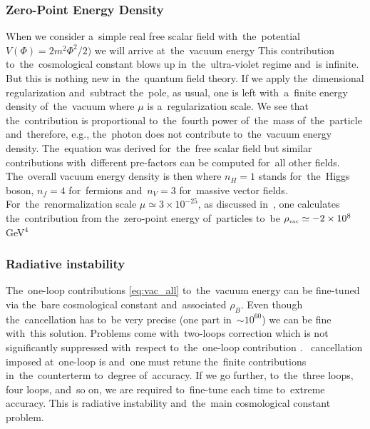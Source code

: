 \subsubsection{Zero-Point Energy Density}
When we consider a~simple real free scalar field with~the~potential $V(\Phi)=2m^2\Phi^2/2)$ we will arrive at~the~vacuum energy
This contribution to~the~cosmological constant blows up in~the~ultra-violet regime and~is infinite. But this is nothing new in~the~quantum field theory. If we apply the~dimensional regularization \parencite{tHooft:1972tcz} and~subtract the~pole, as usual, one is left with~a~finite energy density of~the~vacuum
where $\mu$ is a~regularization scale. We see that the~contribution is proportional to~the~fourth power of~the~mass of~the~particle and~therefore, e.g., the~photon does not contribute to~the~vacuum energy density. The~equation was derived for~the~free scalar field but similar contributions with~different pre-factors can be computed for~all other fields. The~overall vacuum energy density is then
where $n_H=1$ stands for~the~Higgs boson, $n_f=4$ for~fermions and~$n_V=3$ for~massive vector fields. For~the~renormalization scale $\mu\simeq3\times10^{-25}$, as discussed in~\textcite{2011arXiv1105.6296K}, one calculates the~contribution from the~zero-point energy of~particles to~be  $\rho_\text{\tiny vac}\simeq-2\times10^8$ GeV$^4$
\subsubsection{Radiative instability}
The~one-loop contributions \eqref{eq:vac_all} to~the~vacuum energy can be fine-tuned via the~bare cosmological constant and~associated $\rho_B$. Even though the~cancellation has to~be very precise (one part in~$\sim10^{60}$) we can be fine with~this solution. Problems come with~two-loops correction which is not significantly suppressed with~respect to~the~one-loop contribution \parencite{2012CRPhy..13..566M}. \DIFdelbegin {}\DIFdelend \DIFaddbegin {}\DIFaddend ~cancellation imposed at~one-loop is \DIFdelbegin {}\DIFdelend \DIFaddbegin {}\DIFaddend and~one must retune the~finite contributions in~the~counterterm to~\DIFdelbegin {}\DIFdelend \DIFaddbegin {}\DIFaddend degree of~accuracy. If we go further, to~the~three loops, four loops, and~so on, we are required to~fine-tune each time to~extreme accuracy. This is radiative instability and~the~main cosmological constant problem.

